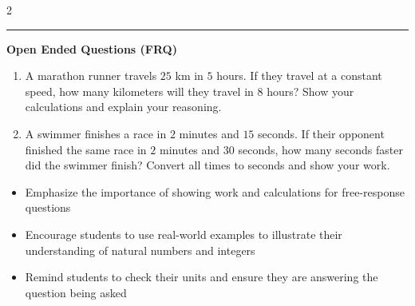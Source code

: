 \documentclass[10pt]{article}
\begin{document}
\begin{multicols}{2}
\begin{enumerate}[label=\textbf{Q\arabic*.}, leftmargin=*, itemsep=6pt, parsep=0pt]
\end{enumerate}
\end{multicols}

\vspace{-0.2cm}
\hrule
\vspace{0.2cm}
\textbf{\small Open Ended Questions (FRQ)}
\begin{enumerate}[label=\textbf{Q\arabic*.}, start=9, itemsep=5pt, topsep=0pt]

  \item \small A marathon runner travels $25$ km in $5$ hours. If they travel at a constant speed, how many kilometers will they travel in $8$ hours? Show your calculations and explain your reasoning. \vspace{2cm}

  \item \small A swimmer finishes a race in $2$ minutes and $15$ seconds. If their opponent finished the same race in $2$ minutes and $30$ seconds, how many seconds faster did the swimmer finish? Convert all times to seconds and show your work. \vspace{2cm}

\end{enumerate}

\vfill

\begin{tcolorbox}[colback=blue!5, colframe=mainblue!50, title=\small \textbf{Chef's Tips}, fonttitle=\bfseries, bottom=1mm]
\begin{itemize}[noitemsep, topsep=2pt, leftmargin=0.5cm]
  \item \scriptsize Emphasize the importance of showing work and calculations for free-response questions\item \scriptsize Encourage students to use real-world examples to illustrate their understanding of natural numbers and integers\item \scriptsize Remind students to check their units and ensure they are answering the question being asked
\end{itemize}
\end{tcolorbox}
\end{document}
